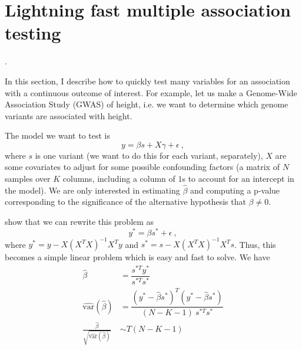 \section{Lightning fast multiple association testing}.

In this section, I describe how to quickly test many variables for an association with a continuous outcome of interest. For example, let us make a Genome-Wide Association Study (GWAS) of height, i.e. we want to determine which genome variants are associated with height.

The model we want to test is $$y = \beta s + X \gamma + \epsilon~,$$ where $s$ is one variant (we want to do this for each variant, separately), $X$ are some covariates to adjust for some possible confounding factors (a matrix of $N$ samples over $K$ columns, including a column of $1$s to account for an intercept in the model). 
We are only interested in estimating $\hat{\beta}$ and computing a p-value corresponding to the significance of the alternative hypothesis that $\beta \neq 0$.

\cite{sikorska2013gwas} show that we can rewrite this problem as $$y^* = \beta s^* + \epsilon~,$$ where $y^* = y - X (X^T X)^{-1} X^T y$ and $s^* = s - X (X^T X)^{-1} X^T s$. Thus, this becomes a simple linear problem which is easy and fast to solve. We have
\begin{align*}
\hat{\beta} &= \dfrac{s^{*T} y^*}{s^{*T} s^*} \\
\widehat{\text{var}}(\hat{\beta}) &= \dfrac{(y^* - \hat{\beta} s^*)^T (y^* - \hat{\beta} s^*)}{(N - K - 1) ~ s^{*T} s^*} \\
\frac{\hat{\beta}}{\sqrt{\widehat{\text{var}}(\hat{\beta})}} &\sim T(N - K - 1)
\end{align*}

